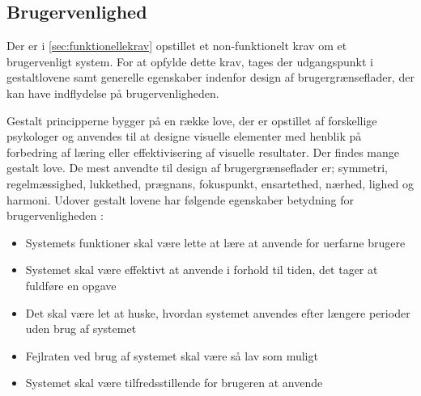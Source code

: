 \subsection{Brugervenlighed}
Der er i \autoref{sec:funktionellekrav} opstillet et non-funktionelt krav om et brugervenligt system. For at opfylde dette krav, tages der udgangspunkt i gestaltlovene samt generelle egenskaber indenfor design af brugergrænseflader, der kan have indflydelse på brugervenligheden. 

Gestalt principperne bygger på en række love, der er opstillet af forskellige psykologer og anvendes til at designe visuelle elementer med henblik på forbedring af læring eller effektivisering af visuelle resultater. Der findes mange gestalt love. De mest anvendte til design af brugergrænseflader er; symmetri, regelmæssighed, lukkethed, prægnans, fokuspunkt, ensartethed, nærhed, lighed og harmoni.\cite{Chang2002} Udover gestalt lovene har følgende egenskaber betydning for brugervenligheden \cite{ferre2001}:
\begin{itemize}
\item Systemets funktioner skal være lette at lære at anvende for uerfarne brugere
\item Systemet skal være effektivt at anvende i forhold til tiden, det tager at fuldføre en opgave
\item Det skal være let at huske, hvordan systemet anvendes efter længere perioder uden brug af systemet
\item Fejlraten ved brug af systemet skal være så lav som muligt
\item Systemet skal være tilfredsstillende for brugeren at anvende
\end{itemize}
 
 
